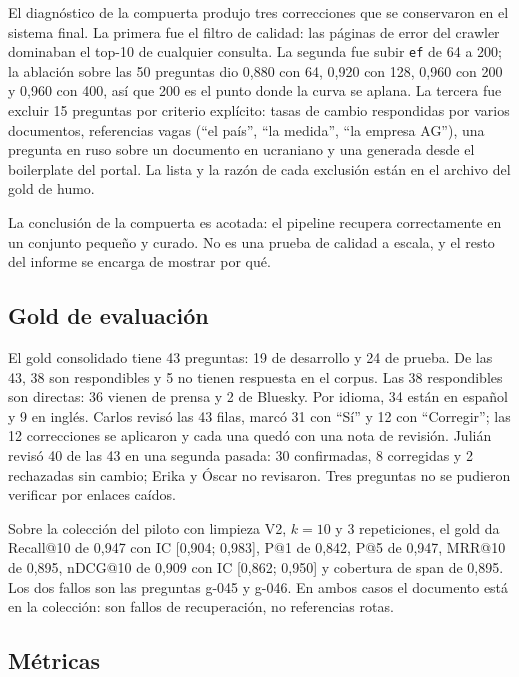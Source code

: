 \documentclass[11pt]{tg_usta}
\begin{document}
El diagnóstico de la compuerta produjo tres correcciones que se conservaron en el sistema final. La primera fue el filtro de calidad: las páginas de error del crawler dominaban el top-10 de cualquier consulta. La segunda fue subir \texttt{ef} de 64 a 200; la ablación sobre las 50 preguntas dio 0,880 con 64, 0,920 con 128, 0,960 con 200 y 0,960 con 400, así que 200 es el punto donde la curva se aplana. La tercera fue excluir 15 preguntas por criterio explícito: tasas de cambio respondidas por varios documentos, referencias vagas (``el país'', ``la medida'', ``la empresa AG''), una pregunta en ruso sobre un documento en ucraniano y una generada desde el boilerplate del portal. La lista y la razón de cada exclusión están en el archivo del gold de humo.

La conclusión de la compuerta es acotada: el pipeline recupera correctamente en un conjunto pequeño y curado. No es una prueba de calidad a escala, y el resto del informe se encarga de mostrar por qué.

\subsection{Gold de evaluación}

El gold consolidado tiene 43 preguntas: 19 de desarrollo y 24 de prueba. De las 43, 38 son respondibles y 5 no tienen respuesta en el corpus. Las 38 respondibles son directas: 36 vienen de prensa y 2 de Bluesky. Por idioma, 34 están en español y 9 en inglés. Carlos revisó las 43 filas, marcó 31 con ``Sí'' y 12 con ``Corregir''; las 12 correcciones se aplicaron y cada una quedó con una nota de revisión. Julián revisó 40 de las 43 en una segunda pasada: 30 confirmadas, 8 corregidas y 2 rechazadas sin cambio; Erika y Óscar no revisaron. Tres preguntas no se pudieron verificar por enlaces caídos.

Sobre la colección del piloto con limpieza V2, $k=10$ y 3 repeticiones, el gold da Recall@10 de 0,947 con IC [0,904; 0,983], P@1 de 0,842, P@5 de 0,947, MRR@10 de 0,895, nDCG@10 de 0,909 con IC [0,862; 0,950] y cobertura de span de 0,895. Los dos fallos son las preguntas g-045 y g-046. En ambos casos el documento está en la colección: son fallos de recuperación, no referencias rotas.

\subsection{Métricas}
\end{document}
